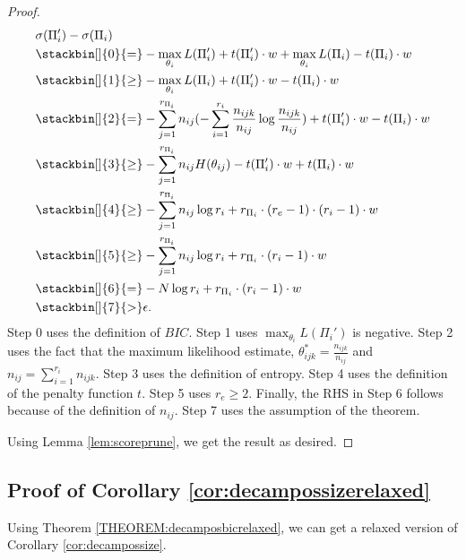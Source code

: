 \documentclass[letterpaper]{article}
\begin{document}
\begin{proof}
\begin{align*}
    &\sigma(\Pi_i') - \sigma(\Pi_i)\\
    & \stackbin[]{0}{=} -\displaystyle \max_{\theta_i} L(\Pi_i') + t(\Pi_i')\cdot w + \displaystyle \max_{\theta_i} L(\Pi_i) - t(\Pi_i)\cdot w \\
    & \stackbin[]{1}{\geq} \displaystyle -\max_{\theta_i} L(\Pi_i) + t(\Pi_i')\cdot w  - t(\Pi_i)\cdot w \\
    &\stackbin[]{2}{=} \displaystyle -\sum_{j=1}^{r_{\Pi_i}}n_{ij}(-\sum^{r_i}_{i=1}\frac{n_{ijk}}{n_{ij}}\log \frac{n_{ijk}}{n_{ij}} )+ t(\Pi_i')\cdot w - t(\Pi_i)\cdot w \\
    & \stackbin[]{3}{\geq} \displaystyle -\sum_{j=1}^{r_{\Pi_i}}n_{ij}H(\theta_{ij})- t(\Pi_i')\cdot w  + t(\Pi_i)\cdot w \\
    & \stackbin[]{4}{\geq}  \displaystyle -\sum_{j=1}^{r_{\Pi_i}}n_{ij}\log r_i + r_{\Pi_i}\cdot(r_e -1)\cdot (r_i -1)\cdot w \\
    & \stackbin[]{5}{\geq}  \displaystyle -\sum_{j=1}^{r_{\Pi_i}}n_{ij}\log r_i + r_{\Pi_i}\cdot (r_i -1)\cdot w \\ 
    & \stackbin[]{6}{=}  -N\log r_i + r_{\Pi_i}\cdot (r_i -1)\cdot w\\
    & \stackbin[]{7}{>} \epsilon.
    \end{align*}
    Step 0  uses the definition of $BIC$. Step 1 uses $ \max_{\theta_i} L(\Pi_i')$ is negative. Step 2 uses the fact that the maximum likelihood estimate, $\theta^\ast_{ijk} = \frac{n_{ijk}}{n_{ij}}$ and $n_{ij} = \sum_{i=1}^{r_{i}}n_{ijk}$. Step 3 uses the definition of entropy. Step 4 uses the definition of the penalty function $t$. Step 5 uses $r_e \geq 2$.  Finally, the RHS in Step 6 follows because of the definition of $n_{ij}$. Step 7 uses the assumption of the theorem. 
    
    Using Lemma \ref{lem:scoreprune}, we get the result as desired.  
	\end{proof}
	
\subsection{Proof of Corollary \ref{cor:decampossizerelaxed}}

Using Theorem \ref{THEOREM:decamposbicrelaxed}, we can get a relaxed version of Corollary \ref{cor:decampossize}.
\end{document}
